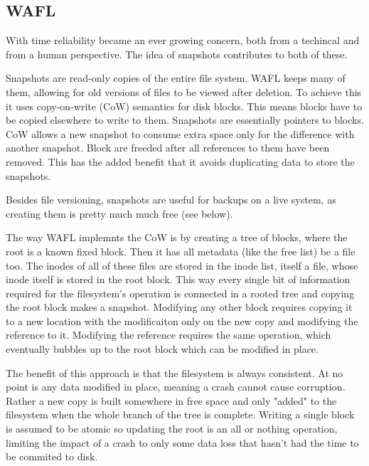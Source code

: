         \subsection{WAFL}
            \label{sec_WAFL}

            With time reliability became an ever growing concern, both from a
            techincal and from a human perspective. The idea of snapshots
            contributes to both of these.

            Snapshots are read-only copies of the entire file system. WAFL
            \cite{WAFL} keeps many of them, allowing for old versions of files
            to be viewed after deletion. To achieve this it uses copy-on-write
            (CoW) semantics for disk blocks. This means blocks have to be
            copied elsewhere to write to them. Snapshots are essentially
            pointers to blocks. CoW allows a new snapshot to consume extra
            space only for the difference with another snapshot. Block are
            freeded after all references to them have been removed. This has
            the added benefit that it avoids duplicating data to store the
            snapshots.

            Besides file versioning, snapshots are useful for backups on a live
            system, as creating them is pretty much much free (see below).

            The way WAFL implemnts the CoW is by creating a tree of blocks,
            where the root is a known fixed block. Then it has all metadata
            (like the free list) be a file too. The inodes of all of these
            files are stored in the inode list, itself a file, whose inode
            itself is stored in the root block. This way every single bit of
            information required for the filesystem's operation is connected in
            a rooted tree and copying the root block makes a snapshot.
            Modifying any other block requires copying it to a new location
            with the modificaiton only on the new copy and modifying the
            reference to it. Modifying the reference requires the same
            operation, which eventually bubbles up to the root block which can
            be modified in place.

            The benefit of this approach is that the filesystem is always
            consistent. At no point is any data modified in place, meaning a
            crash cannot cause corruption. Rather a new copy is built somewhere
            in free space and only "added" to the filesystem when the whole
            branch of the tree is complete. Writing a single block is assumed
            to be atomic \cite{drive_atomicity} so updating the root is an all
            or nothing operation, limiting the impact of a crash to only some
            data loss that hasn't had the time to be commited to disk.

